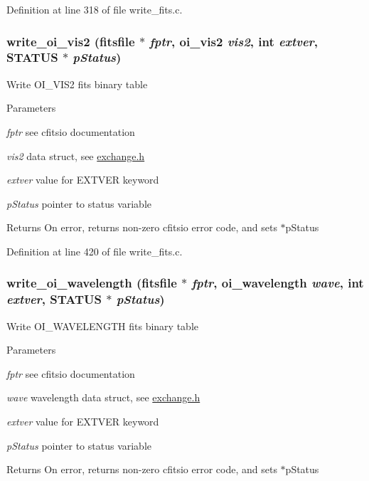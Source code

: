 Definition at line 318 of file write\_\-fits.c.

\hypertarget{group__oitable_ga5f69a00849108909a3cdd4923cc02028}{
\subsubsection[{write\_\-oi\_\-vis2}]{ write\_\-oi\_\-vis2 (fitsfile $\ast$ {\em fptr}, \/  {\bf oi\_\-vis2} {\em vis2}, \/  int {\em extver}, \/  {\bf STATUS} $\ast$ {\em pStatus})}}
\label{group__oitable_ga5f69a00849108909a3cdd4923cc02028}
Write OI\_\-VIS2 fits binary table


\begin{DoxyParams}{Parameters}
\item[{\em fptr}]see cfitsio documentation \item[{\em vis2}]data struct, see \hyperlink{exchange_8h}{exchange.h} \item[{\em extver}]value for EXTVER keyword \item[{\em pStatus}]pointer to status variable\end{DoxyParams}
\begin{DoxyReturn}{Returns}
On error, returns non-\/zero cfitsio error code, and sets $\ast$pStatus 
\end{DoxyReturn}


Definition at line 420 of file write\_\-fits.c.

\hypertarget{group__oitable_ga1e71eee95f16623bb031916e4ec7da23}{
\subsubsection[{write\_\-oi\_\-wavelength}]{ write\_\-oi\_\-wavelength (fitsfile $\ast$ {\em fptr}, \/  {\bf oi\_\-wavelength} {\em wave}, \/  int {\em extver}, \/  {\bf STATUS} $\ast$ {\em pStatus})}}
\label{group__oitable_ga1e71eee95f16623bb031916e4ec7da23}
Write OI\_\-WAVELENGTH fits binary table


\begin{DoxyParams}{Parameters}
\item[{\em fptr}]see cfitsio documentation \item[{\em wave}]wavelength data struct, see \hyperlink{exchange_8h}{exchange.h} \item[{\em extver}]value for EXTVER keyword \item[{\em pStatus}]pointer to status variable\end{DoxyParams}
\begin{DoxyReturn}{Returns}
On error, returns non-\/zero cfitsio error code, and sets $\ast$pStatus 
\end{DoxyReturn}


